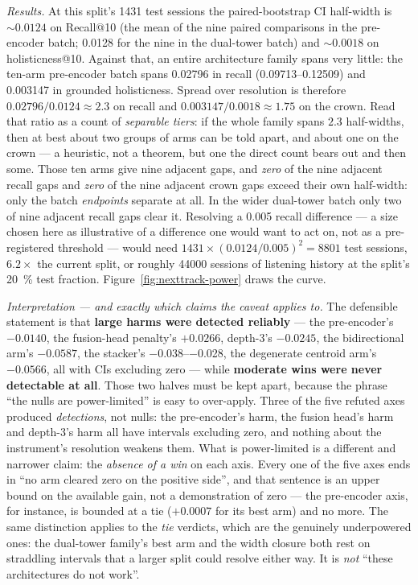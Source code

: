 \documentclass[11pt]{article}
\begin{document}
\emph{Results.} At this split's \num{1431} test sessions the paired-bootstrap CI
half-width is ${\sim}\num{0.0124}$ on Recall@10 (the mean of the nine paired
comparisons in the pre-encoder batch; \num{0.0128} for the nine in the
dual-tower batch) and ${\sim}\num{0.0018}$ on holisticness@10. Against that, an
entire architecture family spans very little: the ten-arm pre-encoder batch
spans \num{0.02796} in recall (\numrange{0.09713}{0.12509}) and \num{0.003147}
in grounded holisticness. Spread over resolution is therefore
$\num{0.02796}/\num{0.0124}\approx\num{2.3}$ on recall and
$\num{0.003147}/\num{0.0018}\approx\num{1.75}$ on the crown. Read that ratio as a
count of \emph{separable tiers}: if the whole family spans $2.3$ half-widths, then
at best about two groups of arms can be told apart, and about one on the crown ---
a heuristic, not a theorem, but one the direct count bears out and then some.
Those ten arms give nine adjacent gaps, and \emph{zero} of the nine adjacent
recall gaps and \emph{zero} of the nine adjacent crown gaps exceed their own
half-width: only the batch \emph{endpoints} separate at all. In the wider
dual-tower batch only two of nine adjacent recall gaps clear it. Resolving a
\num{0.005} recall difference --- a size chosen here as illustrative of a
difference one would want to act on, not as a pre-registered threshold --- would
need $\num{1431}\times(\num{0.0124}/\num{0.005})^2=\num{8801}$ test sessions,
$6.2\times$ the current split, or roughly \num{44000} sessions of listening
history at the split's \SI{20}{\percent} test fraction.
Figure~\ref{fig:nexttrack-power} draws the curve.

\emph{Interpretation --- and exactly which claims the caveat applies to.} The
defensible statement is that \textbf{large harms were detected reliably} --- the
pre-encoder's $-\num{0.0140}$, the fusion-head penalty's $+\num{0.0266}$,
depth-3's $-\num{0.0245}$, the bidirectional arm's $-\num{0.0587}$, the stacker's
\numrange{-0.038}{-0.028}, the degenerate centroid arm's $-\num{0.0566}$, all with
CIs excluding zero --- while \textbf{moderate wins were never detectable at all}.
Those two halves must be kept apart, because the phrase ``the nulls are
power-limited'' is easy to over-apply. Three of the five refuted axes produced
\emph{detections}, not nulls: the pre-encoder's harm, the fusion head's harm and
depth-3's harm all have intervals excluding zero, and nothing about the
instrument's resolution weakens them. What is power-limited is a different and
narrower claim: the \emph{absence of a win} on each axis. Every one of the five
axes ends in ``no arm cleared zero on the positive side'', and that sentence is an
upper bound on the available gain, not a demonstration of zero --- the
pre-encoder axis, for instance, is bounded at a tie ($+\num{0.0007}$ for its best
arm) and no more. The same distinction applies to the \emph{tie} verdicts, which
are the genuinely underpowered ones: the dual-tower family's best arm and the
width closure both rest on straddling intervals that a larger split could
resolve either way. It is \emph{not} ``these architectures do not work''.
\end{document}
